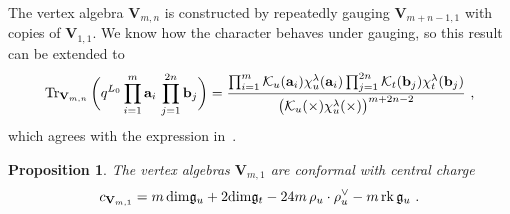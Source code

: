 \documentclass[a4paper]{article}
\newtheorem{prop}[thm]{Proposition}
\def\KK{{\cal K}}
\def\Tr{\mathop{\mathrm{Tr}}\nolimits}
\def\dim{{\rm dim}}
\def\gf{\mathfrak{g}}
\def \rk{\mathrm{rk}}
\def\V{\mathbf{V}}
\begin{document}
The vertex algebra $\V_{m,n}$ is constructed by repeatedly gauging $\V_{m+n-1,1}$ with copies of $\V_{1,1}$. We know how the character behaves under gauging, so this result can be extended to
\begin{equation}\label{eq:mixed_char}
	\Tr_{\V_{m,n}}\bigg(q^{L_0}\prod_{i=1}^{m} \mathbf{a}_i \,\prod_{j=1}^{2n}\mathbf{b}_j\bigg)=\frac{\prod_{i=1}^m \KK_u(\mathbf{a}_i)\chi^\lambda_u(\mathbf{a}_i) \prod_{j=1}^{2n} \KK_t(\mathbf{b}_j)\chi^\lambda_t(\mathbf{b}_j)} {\big( \KK_u(\times)\chi^\lambda_u(\times) \big)^{m+2n-2}}~,
\end{equation}
which agrees with the expression in~\cite{Lemos:2012ph}.

\begin{prop}
The vertex algebras $\V_{m,1}$ are conformal with central charge
\begin{equation*}
	c_{\V_{m,1}} = m\,\dim \gf_u + 2\dim \gf_t -24m\,\rho_u\cdot\rho_u^\vee -m\, \rk\,\gf_u~.
\end{equation*}
\end{prop}
\end{document}

